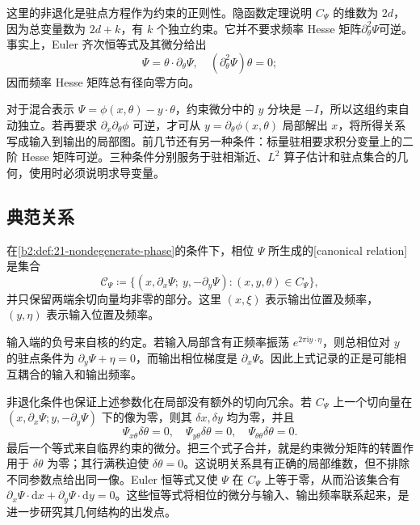 这里的非退化是驻点方程作为约束的正则性。隐函数定理说明 \(C_\Psi\) 的维数为 \(2d\)，因为总变量数为 \(2d+k\)，有 \(k\) 个独立约束。它并不要求频率 Hesse 矩阵\(\partial_\theta^2\Psi\)可逆。事实上，Euler 齐次恒等式及其微分给出
\[
 \Psi=\theta\cdot\partial_\theta\Psi,
 \quad (\partial_\theta^2\Psi)\theta=0;
\]
因而频率 Hesse 矩阵总有径向零方向。

\ProseParagraphBreak
对于混合表示 \(\Psi=\phi(x,\theta)-y\cdot\theta\)，约束微分中的 \(y\) 分块是 \(-I\)，所以这组约束自动独立。若再要求 \(\partial_x\partial_\theta\phi\) 可逆，才可从
\(y=\partial_\theta\phi(x,\theta)\) 局部解出 \(x\)，将所得关系写成输入到输出的局部图。前几节还有另一种条件：标量驻相要求积分变量上的二阶 Hesse 矩阵可逆。三种条件分别服务于驻相渐近、\(L^2\) 算子估计和驻点集合的几何，使用时必须说明求导变量。

\subsection{典范关系}
\label{b2:subsec:210502}

\begin{definition}[相位所生成的典范关系]\label{b2:def:21-canonical-relation}
在\cref{b2:def:21-nondegenerate-phase}的条件下，相位 \(\Psi\) 所生成的[canonical relation]是集合
\[
 \mathcal C_\Psi\coloneqq
 \bigl\{(x,\partial_x\Psi;\ y,-\partial_y\Psi):
       (x,y,\theta)\in C_\Psi\bigr\},
\]
并只保留两端余切向量均非零的部分。这里 \((x,\xi)\) 表示输出位置及频率，\((y,\eta)\) 表示输入位置及频率。
\end{definition}

输入端的负号来自核的约定。若输入局部含有正频率振荡
\(e^{2\pi\mathrm i y\cdot\eta}\)，则总相位对 \(y\) 的驻点条件为
\(\partial_y\Psi+\eta=0\)，而输出相位梯度是 \(\partial_x\Psi\)。因此上式记录的正是可能相互耦合的输入和输出频率。

\ProseParagraphBreak
非退化条件也保证上述参数化在局部没有额外的切向冗余。若 \(C_\Psi\) 上一个切向量在 \((x,\partial_x\Psi;y,-\partial_y\Psi)\) 下的像为零，则其 \(\delta x,\delta y\) 均为零，并且
\[
 \Psi_{x\theta}\delta\theta=0,
 \quad\Psi_{y\theta}\delta\theta=0,
 \quad\Psi_{\theta\theta}\delta\theta=0.
\]
最后一个等式来自临界约束的微分。把三个式子合并，就是约束微分矩阵的转置作用于 \(\delta\theta\) 为零；其行满秩迫使 \(\delta\theta=0\)。这说明关系具有正确的局部维数，但不排除不同参数点给出同一像。Euler 恒等式又使 \(\Psi\) 在 \(C_\Psi\) 上等于零，从而沿该集合有
\(\partial_x\Psi\cdot\mathrm dx+\partial_y\Psi\cdot\mathrm dy=0\)。这些恒等式将相位的微分与输入、输出频率联系起来，是进一步研究其几何结构的出发点。

